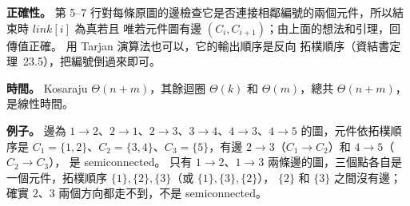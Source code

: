 \begin{pastsoln}
\textbf{正確性。} 第 5--7 行對每條原圖的邊檢查它是否連接相鄰編號的兩個元件，所以結束時 $\mathit{link}[i]$ 為真若且
唯若元件圖有邊 $(C_i, C_{i+1})$；由上面的想法和引理，回傳值正確。 用 Tarjan 演算法也可以，它的輸出順序是反向
拓樸順序（資結書定理~23.5），把編號倒過來即可。

\textbf{時間。} Kosaraju $\Theta(n + m)$，其餘迴圈 $\Theta(k)$ 和 $\Theta(m)$，總共 $\Theta(n + m)$，是線性時間。

\textbf{例子。} 邊為 $1 \to 2$、$2 \to 1$、$2 \to 3$、$3 \to 4$、$4 \to 3$、$4 \to 5$ 的圖，元件依拓樸順序是
$C_1 = \{1, 2\}$、$C_2 = \{3, 4\}$、$C_3 = \{5\}$，有邊 $2 \to 3$（$C_1 \to C_2$）和 $4 \to 5$（$C_2 \to C_3$），
是 semiconnected。 只有 $1 \to 2$、$1 \to 3$ 兩條邊的圖，三個點各自是一個元件，拓樸順序 $\{1\}, \{2\}, \{3\}$（或 $\{1\}, \{3\}, \{2\}$），
$\{2\}$ 和 $\{3\}$ 之間沒有邊；確實 $2$、$3$ 兩個方向都走不到，不是 semiconnected。
\end{pastsoln}
